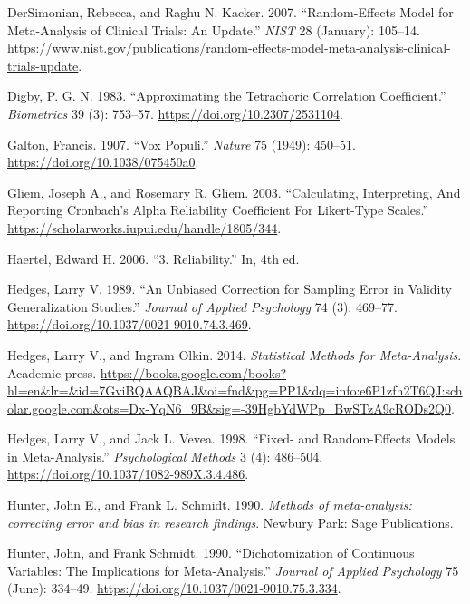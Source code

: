 \documentclass[
  letterpaper,
  DIV=11,
  numbers=noendperiod]{scrreprt}
\newlength{\cslhangindent}
\newlength{\cslentryspacingunit} %
\newenvironment{CSLReferences}[2] %
 {%
  \setlength{\parindent}{0pt}
  \ifodd #1
  \let\oldpar\par
  \def\par{\hangindent=\cslhangindent\oldpar}
  \fi
  \setlength{\parskip}{#2\cslentryspacingunit}
 }%
 {}
\begin{document}
\begin{CSLReferences}{1}{0}
\leavevmode{}%
DerSimonian, Rebecca, and Raghu N. Kacker. 2007. {``Random-Effects Model
for Meta-Analysis of Clinical Trials: An Update.''} \emph{NIST} 28
(January): 105--14.
\url{https://www.nist.gov/publications/random-effects-model-meta-analysis-clinical-trials-update}.

\leavevmode{}%
Digby, P. G. N. 1983. {``Approximating the Tetrachoric Correlation
Coefficient.''} \emph{Biometrics} 39 (3): 753--57.
\url{https://doi.org/10.2307/2531104}.

\leavevmode{}%
Galton, Francis. 1907. {``Vox Populi.''} \emph{Nature} 75 (1949):
450--51. \url{https://doi.org/10.1038/075450a0}.

\leavevmode{}%
Gliem, Joseph A., and Rosemary R. Gliem. 2003. {``Calculating,
Interpreting, And Reporting Cronbach{'}s Alpha Reliability Coefficient
For Likert-Type Scales.''}
\url{https://scholarworks.iupui.edu/handle/1805/344}.

\leavevmode{}%
Haertel, Edward H. 2006. {``3. Reliability.''} In, 4th ed.

\leavevmode{}%
Hedges, Larry V. 1989. {``An Unbiased Correction for Sampling Error in
Validity Generalization Studies.''} \emph{Journal of Applied Psychology}
74 (3): 469--77. \url{https://doi.org/10.1037/0021-9010.74.3.469}.

\leavevmode{}%
Hedges, Larry V., and Ingram Olkin. 2014. \emph{Statistical Methods for
Meta-Analysis}. Academic press.
\url{https://books.google.com/books?hl=en\&lr=\&id=7GviBQAAQBAJ\&oi=fnd\&pg=PP1\&dq=info:e6P1zfh2T6QJ:scholar.google.com\&ots=Dx-YqN6_9B\&sig=-39HgbYdWPp_BwSTzA9cRODs2Q0}.

\leavevmode{}%
Hedges, Larry V., and Jack L. Vevea. 1998. {``Fixed- and Random-Effects
Models in Meta-Analysis.''} \emph{Psychological Methods} 3 (4):
486--504. \url{https://doi.org/10.1037/1082-989X.3.4.486}.

\leavevmode{}%
Hunter, John E., and Frank L. Schmidt. 1990. \emph{Methods of
meta-analysis: correcting error and bias in research findings}. Newbury
Park: Sage Publications.

\leavevmode{}%
Hunter, John, and Frank Schmidt. 1990. {``Dichotomization of Continuous
Variables: The Implications for Meta-Analysis.''} \emph{Journal of
Applied Psychology} 75 (June): 334--49.
\url{https://doi.org/10.1037/0021-9010.75.3.334}.


\end{CSLReferences}
\end{document}
